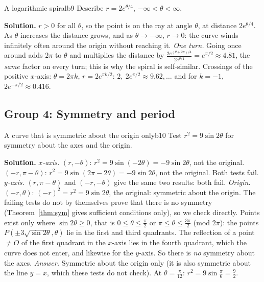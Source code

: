 \documentclass[11pt]{article}
\begin{document}
\begin{exmp}{A logarithmic spiral}{b9}
Describe $r=2e^{\theta/4}$, $-\infty<\theta<\infty$.

\textbf{Solution.} $r>0$ for all $\theta$, so the point is on the ray at angle $\theta$, at distance $2e^{\theta/4}$. As $\theta$ increases the distance grows, and as $\theta\to-\infty$, $r\to0$: the curve winds infinitely often around the origin without reaching it. \emph{One turn.} Going once around adds $2\pi$ to $\theta$ and multiplies the distance by $\frac{2e^{(\theta+2\pi)/4}}{2e^{\theta/4}}=e^{\pi/2}\approx4.81$, the \emph{same} factor on every turn; this is why the spiral is self-similar. Crossings of the positive $x$-axis: $\theta=2\pi k$, $r=2e^{\pi k/2}$: $2,\ 2e^{\pi/2}\approx9.62,\dots$ and for $k=-1$, $2e^{-\pi/2}\approx0.416$.
\end{exmp}

\subsection*{Group 4: Symmetry and period}

\begin{exmp}{A curve that is symmetric about the origin only}{b10}
Test $r^2=9\sin2\theta$ for symmetry about the axes and the origin.

\textbf{Solution.} \emph{$x$-axis.} $(r,-\theta)$: $r^2=9\sin(-2\theta)=-9\sin2\theta$, not the original. $(-r,\pi-\theta)$: $r^2=9\sin(2\pi-2\theta)=-9\sin2\theta$, not the original. Both tests fail. \emph{$y$-axis.} $(r,\pi-\theta)$ and $(-r,-\theta)$ give the same two results: both fail. \emph{Origin.} $(-r,\theta)$: $(-r)^2=r^2=9\sin2\theta$, the original: symmetric about the origin.
The failing tests do not by themselves prove that there is no symmetry (Theorem~\ref{thm:sym} gives sufficient conditions only), so we check directly. Points exist only where $\sin2\theta\ge0$, that is $0\le\theta\le\frac\pi2$ or $\pi\le\theta\le\frac{3\pi}2$ (mod $2\pi$): the points $P(\pm3\sqrt{\sin2\theta},\theta)$ lie in the first and third quadrants. The reflection of a point $\neq O$ of the first quadrant in the $x$-axis lies in the fourth quadrant, which the curve does not enter, and likewise for the $y$-axis. So there is \emph{no} symmetry about the axes. \emph{Answer.} Symmetric about the origin only (it is also symmetric about the line $y=x$, which these tests do not check). At $\theta=\frac\pi{12}$: $r^2=9\sin\frac\pi6=\frac92$.
\end{exmp}
\end{document}
